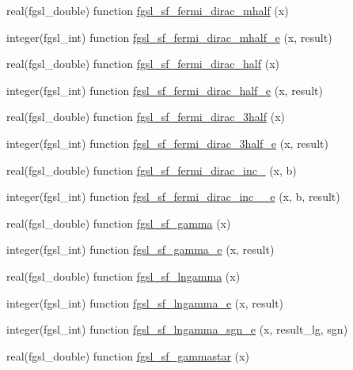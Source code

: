 \begin{DoxyCompactItemize}
\item 
real(fgsl\-\_\-double) function \hyperlink{specfunc_8finc_a49deb5984fe9f1d840ce7d11adbbadd9}{fgsl\-\_\-sf\-\_\-fermi\-\_\-dirac\-\_\-mhalf} (x)
\item 
integer(fgsl\-\_\-int) function \hyperlink{specfunc_8finc_a47006f83ac0109642ee9e09e8009316f}{fgsl\-\_\-sf\-\_\-fermi\-\_\-dirac\-\_\-mhalf\-\_\-e} (x, result)
\item 
real(fgsl\-\_\-double) function \hyperlink{specfunc_8finc_a43a9df047893e2cdf5b08ce4d949d2d4}{fgsl\-\_\-sf\-\_\-fermi\-\_\-dirac\-\_\-half} (x)
\item 
integer(fgsl\-\_\-int) function \hyperlink{specfunc_8finc_acbc03700253fa611c06df89599db49e0}{fgsl\-\_\-sf\-\_\-fermi\-\_\-dirac\-\_\-half\-\_\-e} (x, result)
\item 
real(fgsl\-\_\-double) function \hyperlink{specfunc_8finc_a7895eca050c928050b368d6420db34c5}{fgsl\-\_\-sf\-\_\-fermi\-\_\-dirac\-\_\-3half} (x)
\item 
integer(fgsl\-\_\-int) function \hyperlink{specfunc_8finc_aa53efeb5a773eee83b61e14b1e8bff60}{fgsl\-\_\-sf\-\_\-fermi\-\_\-dirac\-\_\-3half\-\_\-e} (x, result)
\item 
real(fgsl\-\_\-double) function \hyperlink{specfunc_8finc_a7196ccb37de9c0cee74474a21229edc3}{fgsl\-\_\-sf\-\_\-fermi\-\_\-dirac\-\_\-inc\-\_} (x, b)
\item 
integer(fgsl\-\_\-int) function \hyperlink{specfunc_8finc_a6022a04398679d3d36fba8f20bec29d5}{fgsl\-\_\-sf\-\_\-fermi\-\_\-dirac\-\_\-inc\-\_\-\_\-e} (x, b, result)
\item 
real(fgsl\-\_\-double) function \hyperlink{specfunc_8finc_a22d0896ae7f07082ec311981ca10c06a}{fgsl\-\_\-sf\-\_\-gamma} (x)
\item 
integer(fgsl\-\_\-int) function \hyperlink{specfunc_8finc_adbcecf1033cdc899b05e34fddb52574d}{fgsl\-\_\-sf\-\_\-gamma\-\_\-e} (x, result)
\item 
real(fgsl\-\_\-double) function \hyperlink{specfunc_8finc_a3366e0498820e05faceffd9b4e5ef96a}{fgsl\-\_\-sf\-\_\-lngamma} (x)
\item 
integer(fgsl\-\_\-int) function \hyperlink{specfunc_8finc_a6da8dad547399e50f65840de68047ade}{fgsl\-\_\-sf\-\_\-lngamma\-\_\-e} (x, result)
\item 
integer(fgsl\-\_\-int) function \hyperlink{specfunc_8finc_a73d2e8584445eb1d4bbd2306091e92f4}{fgsl\-\_\-sf\-\_\-lngamma\-\_\-sgn\-\_\-e} (x, result\-\_\-lg, sgn)
\item 
real(fgsl\-\_\-double) function \hyperlink{specfunc_8finc_ae531dae295cc1cdeb68df23e1fce4a25}{fgsl\-\_\-sf\-\_\-gammastar} (x)

\end{DoxyCompactItemize}
